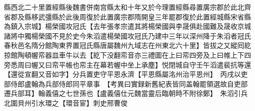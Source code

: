 縣西北二十里置經縣後魏書併南宫縣太和十年又於今理置經縣尋置廣宗郡於此北齊省郡及縣移武彊縣於此後周復於此置廣宗郡隋開皇三年罷郡復於此置經城縣宋省縣為鎮入宗城】楊榮國攻冠氏【去年張孝宗遣其將楊榮國與李晟俱赴國難及晟收京城諸將中獨楊榮國不見於史今朱滔遣楊榮國攻冠氏乃建中三年以深州降于朱滔者冠氏春秋邑名隋分館陶東界置冠氏縣唐屬魏州九域志在州東北六十里】皆拔之又縱囘紇掠館陶頓幄帟器皿車牛以去【紇下没翻帟音亦三禮圖在上曰帟四旁及上曰帷上下四旁悉周曰幄又曰帟平帳也帟主在幕若幄中坐上承塵】悦閉城自守壬午滔遣裴抗等還【還從宣翻又音如字】分兵置吏守平恩永濟【平恩縣屬洺州治平恩州】　丙戌以吏部侍郎盧翰為兵部侍郎同平章事　【考異曰實録新舊紀表皆同盖翰罷領選故自吏部遷兵部耳】翰義僖之七世孫也【盧義僖仕元魏當靈后臨朝時不附徐鄭】　朱滔引兵北圍貝州引水環之【環音宦】刺史邢曹俊